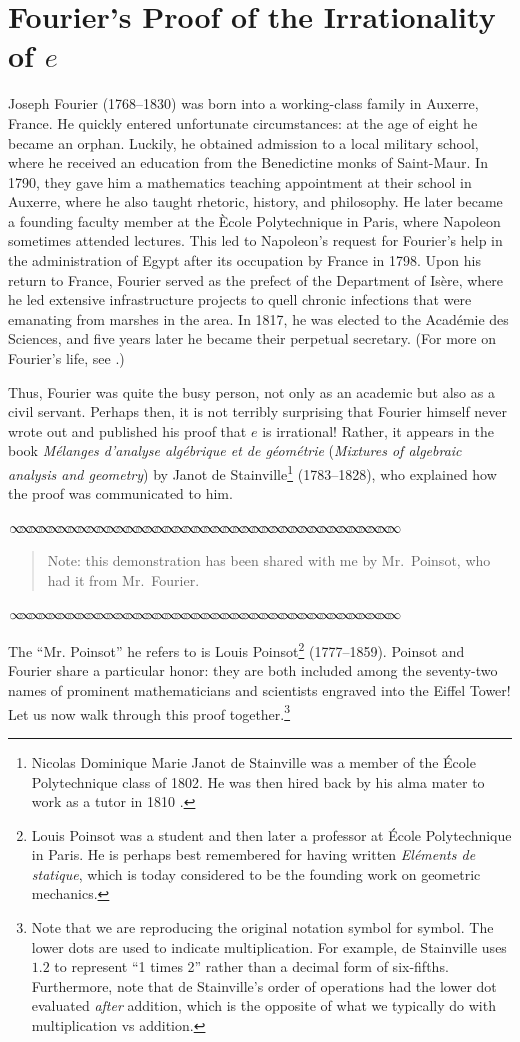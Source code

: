 \documentclass[11pt]{article}
\newcommand{\sep}{\vspace{-3pt}
\begin{center}
{\mathversion{normal}
$\infty \mspace{-5.5mu}\infty \mspace{-5.5mu}\infty \mspace{-5.5mu}\infty \mspace{-5.5mu}
\infty \mspace{-5.5mu}\infty \mspace{-5.5mu}\infty \mspace{-5.5mu}\infty \mspace{-5.5mu}
\infty \mspace{-5.5mu}\infty \mspace{-5.5mu}\infty \mspace{-5.5mu}\infty \mspace{-5.5mu}
\infty \mspace{-5.5mu}\infty \mspace{-5.5mu}\infty \mspace{-5.5mu}\infty \mspace{-5.5mu}
\infty \mspace{-5.5mu}\infty \mspace{-5.5mu}\infty \mspace{-5.5mu}\infty \mspace{-5.5mu}
\infty \mspace{-5.5mu}\infty \mspace{-5.5mu}\infty \mspace{-5.5mu}\infty \mspace{-5.5mu}
\infty \mspace{-5.5mu}\infty \mspace{-5.5mu}\infty \mspace{-5.5mu}\infty \mspace{-5.5mu}
\infty \mspace{-5.5mu}\infty \mspace{-5.5mu}\infty \mspace{-5.5mu}\infty \mspace{-5.5mu}
\infty \mspace{-5.5mu}\infty \mspace{-5.5mu}\infty \mspace{-5.5mu}\infty \mspace{-5.5mu}
\infty \mspace{-5.5mu}\infty \mspace{-5.5mu}\infty \mspace{-5.5mu}\infty \mspace{-5.5mu}$}
\end{center} \vspace*{-5pt}}
\newenvironment{source}%
 {\bigskip \sep \vspace*{-6pt} \begin{quote}
          \begin{sf}   }
   {   \end{sf}     \end{quote} \vspace*{-6pt} \sep \bigskip}%
\begin{document}
\section{Fourier's Proof of the Irrationality of $e$}\label{e}

Joseph Fourier (1768--1830) was born into a working-class family in Auxerre, France. He quickly entered unfortunate circumstances: at the age of eight he became an orphan.  Luckily, he obtained admission to a local military school, where he received an education from the Benedictine monks of Saint-Maur.  In 1790, they gave him a mathematics teaching appointment at their school in Auxerre, where he also taught rhetoric, history, and philosophy.  He later became a founding faculty member at the \`{E}cole Polytechnique in Paris, where Napoleon sometimes attended lectures.  This led to Napoleon's request for Fourier's help in the administration of Egypt after its occupation by France in 1798.  Upon his return to France, Fourier served as the prefect of the Department of Is\`{e}re, where he led extensive infrastructure projects to quell chronic infections that were emanating from marshes in the area.  In 1817, he was elected to the Acad\'emie des Sciences, and five years later he became their perpetual secretary.  (For more on Fourier's life, see \citep{GreatBooks}.)  

Thus, Fourier was quite the busy person, not only as an academic but also as a civil servant.  Perhaps then, it is not terribly surprising that Fourier himself never wrote out and published his proof that $e$ is irrational!  Rather, it appears in the book \emph{M\'{e}langes d'analyse alg\'{e}brique et de g\'{e}om\'{e}trie} \citep[339]{Stainville} (\emph{Mixtures of algebraic analysis and geometry}) by Janot de Stainville\footnote{Nicolas Dominique Marie Janot de Stainville was a member of the \'Ecole Polytechnique class of 1802.  He was then hired back by his alma mater to work as a tutor in 1810 \citep{Verdier}.}  (1783--1828), who explained how the proof was communicated to him. 

\begin{source}
Note: this demonstration has been shared with me by Mr.\ Poinsot, who had it from Mr.\ Fourier.
\end{source}

The ``{\sf Mr. Poinsot}'' he refers to is Louis Poinsot\footnote{Louis Poinsot was a student and then later a professor at \'Ecole Polytechnique in Paris. He is perhaps best remembered for having written \emph{El\'ements de statique}, which is today considered to be the founding work on geometric mechanics.} (1777--1859). Poinsot and Fourier share a particular honor: they are both included among the seventy-two names of prominent mathematicians and scientists engraved into the Eiffel Tower!  Let us now walk through this proof together.\footnote{Note that we are reproducing the original notation symbol for symbol.  The lower dots are used to indicate multiplication.  For example, de Stainville uses $1.2$ to represent ``1 times 2'' rather than a decimal form of six-fifths.  Furthermore, note that de Stainville's order of operations had the lower dot evaluated \emph{after} addition, which is the opposite of what we typically do with multiplication vs addition.}
\end{document}
